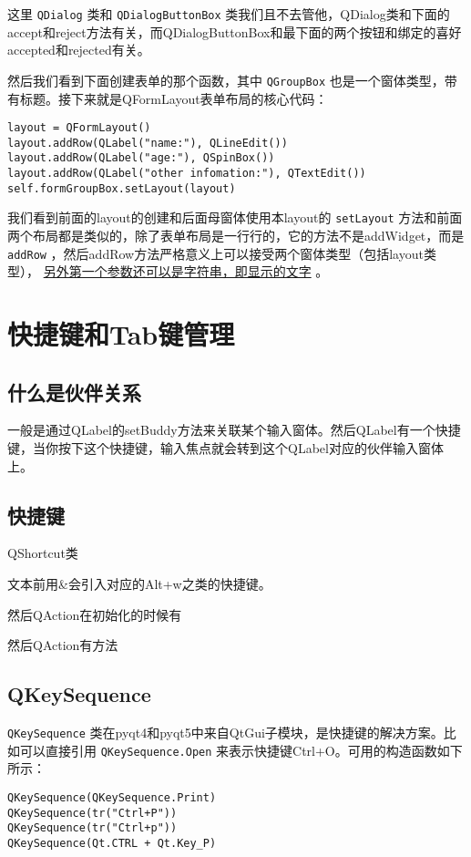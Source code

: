 \documentclass[11pt,oneside]{article}
\begin{document}
这里 \texttt{QDialog} 类和 \texttt{QDialogButtonBox} 类我们且不去管他，QDialog类和下面的accept和reject方法有关，而QDialogButtonBox和最下面的两个按钮和绑定的喜好accepted和rejected有关。

然后我们看到下面创建表单的那个函数，其中 \texttt{QGroupBox} 也是一个窗体类型，带有标题。接下来就是QFormLayout表单布局的核心代码：
\begin{Verbatim}
layout = QFormLayout()
layout.addRow(QLabel("name:"), QLineEdit())
layout.addRow(QLabel("age:"), QSpinBox())
layout.addRow(QLabel("other infomation:"), QTextEdit())
self.formGroupBox.setLayout(layout)
\end{Verbatim}


我们看到前面的layout的创建和后面母窗体使用本layout的 \texttt{setLayout} 方法和前面两个布局都是类似的，除了表单布局是一行行的，它的方法不是addWidget，而是 \texttt{addRow} ，然后addRow方法严格意义上可以接受两个窗体类型（包括layout类型）， \uline{另外第一个参数还可以是字符串，即显示的文字} 。


\section{快捷键和Tab键管理}
\label{sec:orgheadline42}
\subsection{什么是伙伴关系}
\label{sec:orgheadline39}
一般是通过QLabel的setBuddy方法来关联某个输入窗体。然后QLabel有一个快捷键，当你按下这个快捷键，输入焦点就会转到这个QLabel对应的伙伴输入窗体上。

\subsection{快捷键}
\label{sec:orgheadline40}
QShortcut类

文本前用\&会引入对应的Alt+w之类的快捷键。

然后QAction在初始化的时候有

然后QAction有方法



\subsection{QKeySequence}
\label{sec:orgheadline41}
\texttt{QKeySequence} 类在pyqt4和pyqt5中来自QtGui子模块，是快捷键的解决方案。比如可以直接引用 \texttt{QKeySequence.Open} 来表示快捷键Ctrl+O。可用的构造函数如下所示：

\begin{Verbatim}
QKeySequence(QKeySequence.Print)
QKeySequence(tr("Ctrl+P"))
QKeySequence(tr("Ctrl+p"))
QKeySequence(Qt.CTRL + Qt.Key_P)
\end{Verbatim}
\end{document}
